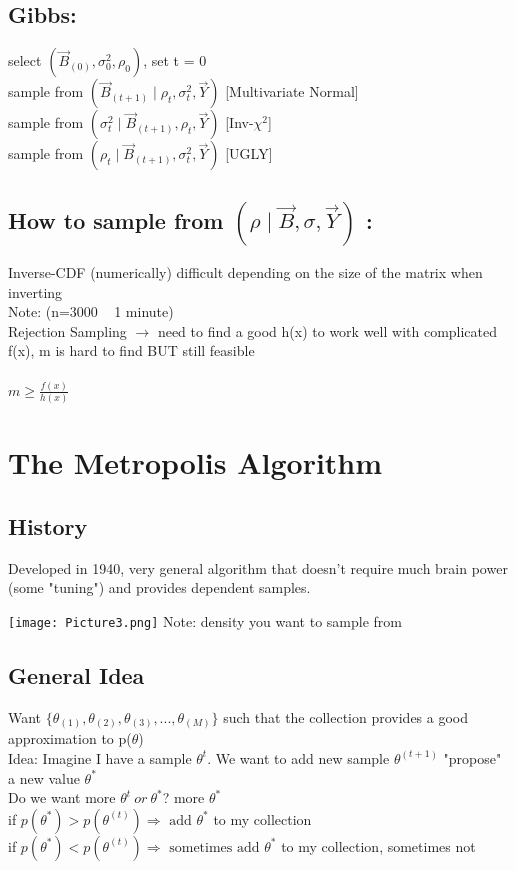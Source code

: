 \documentclass{article}
\begin{document}
\subsection{Gibbs:} 
\textbullet\: select $(\vec{B}_{(0)}, \sigma_{0}^{2}, \rho_{0})$, set t = 0 \\
\textbullet\: sample from $(\vec{B}_{(t+1)} \mid \rho_{t}, \sigma_{t}^{2}, 
\vec{Y})$ [Multivariate Normal] \\ 
\textbullet\: sample from $(\sigma_{t}^{2}\mid \vec{B}_{(t+1)}, \rho_{t}, 
\vec{Y})$ [Inv-$\chi^{2}$] \\
\textbullet\: sample from $(\rho_{t}\mid \vec{B}_{(t+1)}, \sigma_{t}^{2}, 
\vec{Y})$ [UGLY] \\

\subsection{How to sample from $(\rho\mid \vec{B}, \sigma, \vec{Y})$ :}
\textbullet\: Inverse-CDF (numerically) difficult depending on the size of 
the matrix when inverting \\ Note: (n=3000 ~ 1 minute) \\
\textbullet\: Rejection Sampling $\rightarrow$ need to find a good h(x) to 
work well with complicated f(x), m is hard to find BUT still feasible \\ \\
$m \ge \frac{f(x)}{h(x)}$


\section{The Metropolis Algorithm}
\subsection{History}
Developed in 1940, very general algorithm that doesn't require much brain 
power (some "tuning") and provides dependent samples.

\texttt{[image: Picture3.png]}
Note: density you want to sample from

\subsection{General Idea}
Want $\{\theta_{(1)}, \theta_{(2)},\theta_{(3)}, ..., \theta_{(M)}\}$
  such that the collection provides a good approximation to p($\theta$) \\
  Idea: Imagine I have a sample $\theta^{t}$. We want to add new sample $\theta^{(t+1)}$
  "propose" a new value $\theta^{*}$ \\
  Do we want more $\theta^{t} \:or\: \theta^{*}$? more $\theta^{*}$ \\
  \textbullet\: if $p(\theta^{*}) > p(\theta^{(t)}) \Rightarrow \text{ add }
  \theta^{*}$ to my collection \\
  \textbullet\: if $p(\theta^{*}) < p(\theta^{(t)}) \Rightarrow 
  \text{ sometimes add }\theta^{*}$ to my collection,
  sometimes not \\
\end{document}
